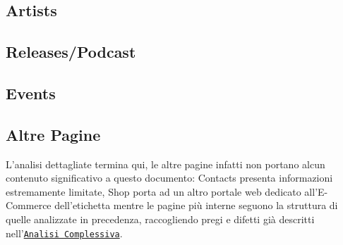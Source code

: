 \documentclass[10pt,a4paper]{article}
\begin{document}
\subsection{Artists}
\label{sec-artists}

\subsection{Releases/Podcast}

\subsection{Events}

\subsection{Altre Pagine}
L'analisi dettagliate termina qui, le altre pagine infatti non portano alcun contenuto significativo a questo documento: Contacts presenta informazioni estremamente limitate, Shop porta ad un altro portale web dedicato all'E-Commerce dell'etichetta mentre le pagine più interne seguono la struttura di quelle analizzate in precedenza, raccogliendo pregi e difetti già descritti nell'\hyperref[sec-complessiva]{\texttt{Analisi Complessiva}}.
\end{document}

